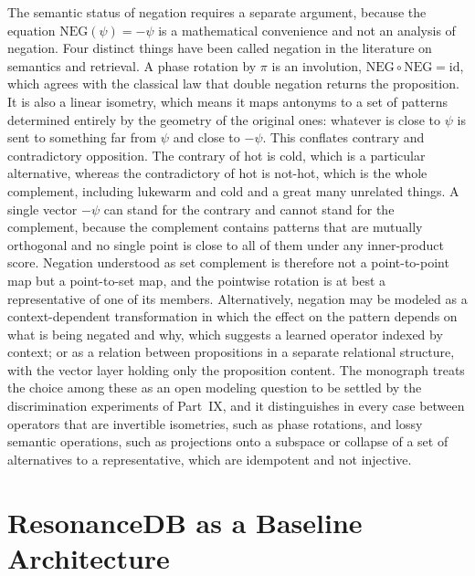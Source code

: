 The semantic status of negation requires a separate argument, because the equation $\mathrm{NEG}(\psi)=-\psi$ is a mathematical convenience and not an analysis of negation. Four distinct things have been called negation in the literature on semantics and retrieval. A phase rotation by $\pi$ is an involution, $\mathrm{NEG}\circ\mathrm{NEG}=\mathrm{id}$, which agrees with the classical law that double negation returns the proposition. It is also a linear isometry, which means it maps antonyms to a set of patterns determined entirely by the geometry of the original ones: whatever is close to $\psi$ is sent to something far from $\psi$ and close to $-\psi$. This conflates contrary and contradictory opposition. The contrary of hot is cold, which is a particular alternative, whereas the contradictory of hot is not-hot, which is the whole complement, including lukewarm and cold and a great many unrelated things. A single vector $-\psi$ can stand for the contrary and cannot stand for the complement, because the complement contains patterns that are mutually orthogonal and no single point is close to all of them under any inner-product score. Negation understood as set complement is therefore not a point-to-point map but a point-to-set map, and the pointwise rotation is at best a representative of one of its members. Alternatively, negation may be modeled as a context-dependent transformation in which the effect on the pattern depends on what is being negated and why, which suggests a learned operator indexed by context; or as a relation between propositions in a separate relational structure, with the vector layer holding only the proposition content. The monograph treats the choice among these as an open modeling question to be settled by the discrimination experiments of Part~IX, and it distinguishes in every case between operators that are invertible isometries, such as phase rotations, and lossy semantic operations, such as projections onto a subspace or collapse of a set of alternatives to a representative, which are idempotent and not injective.

\chapter{ResonanceDB as a Baseline Architecture}\label{ch:resonancedb}

